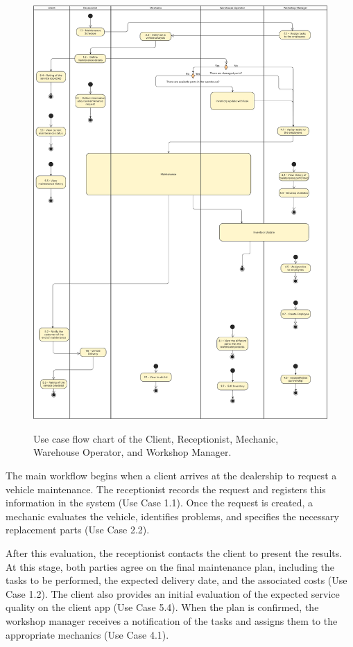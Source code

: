 \begin{figure}[h]
  \caption{Use case flow chart of the Client, Receptionist, Mechanic, Warehouse Operator, and Workshop Manager.}
  \centering
  \includegraphics[width=\textwidth]{figs/UseCaseDiagram - General}
  \label{fig:appWorkflow}
\end{figure}

The main workflow begins when a client arrives at the dealership to request a vehicle maintenance. The receptionist records the request and registers this information in the system (Use Case 1.1). Once the request is created, a mechanic evaluates the vehicle, identifies problems, and specifies the necessary replacement parts (Use Case 2.2).

After this evaluation, the receptionist contacts the client to present the results. At this stage, both parties agree on the final maintenance plan, including the tasks to be performed, the expected delivery date, and the associated costs (Use Case 1.2). The client also provides an initial evaluation of the expected service quality on the client app (Use Case 5.4). When the plan is confirmed, the workshop manager receives a notification of the tasks and assigns them to the appropriate mechanics (Use Case 4.1).

